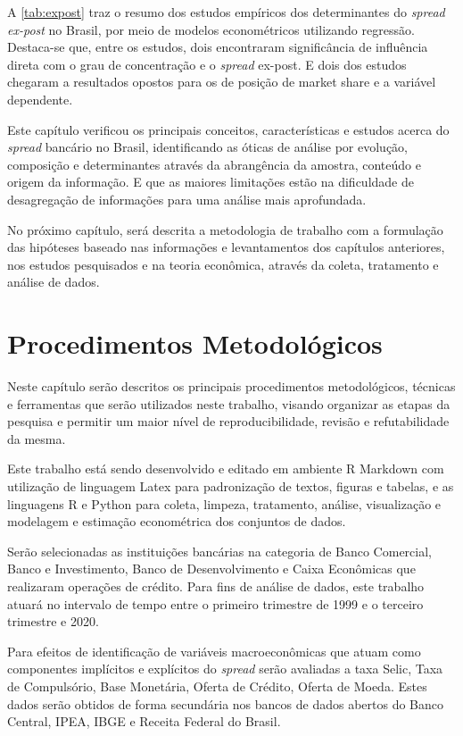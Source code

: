 \documentclass[12pt,12pt,openright,oneside,a4paper,chapter=TITLE,section=TITLE,subsection=TITLE,subsubsection=TITLE english,french,spanish,portugues,sumario=tradicional]{abntex2}
\begin{document}
A \autoref{tab:expost} traz o resumo dos estudos empíricos dos determinantes do
\emph{spread ex-post} no Brasil, por meio de modelos econométricos utilizando
regressão. Destaca-se que, entre os estudos, dois encontraram significância de
influência direta com o grau de concentração e o \emph{spread} ex-post. E dois dos
estudos chegaram a resultados opostos para os de posição de market share e a
variável dependente.

Este capítulo verificou os principais conceitos, características e estudos
acerca do \emph{spread} bancário no Brasil, identificando as óticas de análise por
evolução, composição e determinantes através da abrangência da amostra,
conteúdo e origem da informação. E que as maiores limitações estão na
dificuldade de desagregação de informações para uma análise mais aprofundada.

No próximo capítulo, será descrita a metodologia de trabalho com a formulação
das hipóteses baseado nas informações e levantamentos dos capítulos anteriores,
nos estudos pesquisados e na teoria econômica, através da coleta, tratamento e
análise de dados.

\textual
\pagestyle{simple}

\chapter{Procedimentos Metodológicos}

Neste capítulo serão descritos os principais procedimentos metodológicos,
técnicas e ferramentas que serão utilizados neste trabalho, visando organizar as etapas da pesquisa e permitir um maior nível de reproducibilidade, revisão e
refutabilidade da mesma.

Este trabalho está sendo desenvolvido e editado em ambiente R Markdown com utilização de linguagem Latex para padronização de textos, figuras e tabelas, e as linguagens R e Python para coleta, limpeza, tratamento, análise, visualização e modelagem e estimação econométrica dos conjuntos de dados.

Serão selecionadas as instituições bancárias na categoria de Banco Comercial, Banco e Investimento, Banco de Desenvolvimento e Caixa Econômicas que realizaram operações de crédito. Para fins de análise de dados, este trabalho atuará no intervalo de tempo entre o primeiro trimestre de 1999 e o terceiro trimestre e 2020.

Para efeitos de identificação de variáveis macroeconômicas que atuam como componentes implícitos e explícitos do \emph{spread} serão avaliadas a taxa Selic, Taxa de Compulsório, Base Monetária, Oferta de Crédito, Oferta de Moeda. Estes dados serão obtidos de forma secundária nos bancos de dados abertos do Banco Central, IPEA, IBGE e Receita Federal do Brasil.
\end{document}
